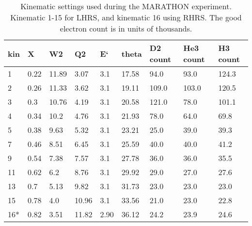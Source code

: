 \begin{table}[t]
	\caption{Kinematic settings used during the MARATHON experiment. Kinematic 1-15 for LHRS, and kinematic 16 using RHRS. The good electron count is in units of thousands. }
	\label{newkin}
	\begin{tabular}{|l|l|l|l|l|l|l|l|l|}
		\hline
		kin & X    & W2    & Q2    & E`   & theta & D2 count & He3 count & H3 count \\ \hline
		1   & 0.22 & 11.89 & 3.07  & 3.1  & 17.58 & 94.0   & 93.0      & 124.3    \\ \hline
		2   & 0.26 & 11.33 & 3.62  & 3.1  & 19.11 & 109.0  & 103.0     & 120.5    \\ \hline
		3   & 0.3  & 10.76 & 4.19  & 3.1  & 20.58 & 121.0  & 78.0      & 101.1    \\ \hline
		4   & 0.34 & 10.2  & 4.76  & 3.1  & 21.93 & 78.0   & 64.0      & 69.8     \\ \hline
		5   & 0.38 & 9.63  & 5.32  & 3.1  & 23.21 & 25.0   & 39.0      & 39.3     \\ \hline
		7   & 0.46 & 8.51  & 6.45  & 3.1  & 25.59 & 40.0   & 40.0      & 41.2     \\ \hline
		9   & 0.54 & 7.38  & 7.57  & 3.1  & 27.78 & 36.0   & 36.0      & 35.5     \\ \hline
		11  & 0.62 & 6.2   & 8.76  & 3.1  & 29.92 & 29.0   & 27.0      & 27.6     \\ \hline
		13  & 0.7  & 5.13  & 9.82  & 3.1  & 31.73 & 23.0   & 23.0      & 23.0     \\ \hline
		15  & 0.78 & 4.0   & 10.96 & 3.1  & 33.56 & 21.0   & 23.0      & 22.8     \\ \hline
		16* & 0.82 & 3.51  & 11.82 & 2.90 & 36.12 &24.2    &23.9	   & 24.6 \\ \hline
	\end{tabular}
\end{table}

